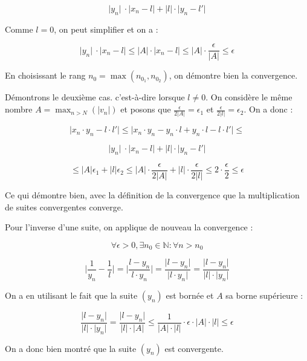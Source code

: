 $$\lvert  y_n  \rvert \ \cdot \lvert x_n - l\rvert + \lvert l \rvert \cdot \lvert y_n - l' \rvert$$

Comme $l = 0$, on peut simplifier et on a :

$$\lvert  y_n  \rvert \ \cdot \lvert x_n - l\rvert \leq \lvert A \rvert \cdot \lvert x_n - l\rvert \leq \lvert A \rvert \cdot \frac{\epsilon}{\lvert A \rvert} \leq \epsilon$$

En choisissant le rang $n_0 = \max({n_{0_1}, n_{0_2}})$, on démontre bien la convergence.

Démontrons le deuxième cas. c'est-à-dire lorsque $l \ne 0$. On considère le même nombre $A = \max_{n>N}({\lvert v_n \rvert})$ et posons que $\frac{\epsilon}{2 \lvert A \rvert} =  \epsilon_1$ et $\frac{\epsilon}{2 \lvert l \rvert} = \epsilon_2$. On a donc :

$$\lvert x_n \cdot y_n - l \cdot l' \rvert \leq \lvert x_n \cdot y_n  - y_n \cdot l + y_n\cdot l- l \cdot l' \rvert \leq $$

$$\lvert  y_n  \rvert \ \cdot \lvert x_n - l\rvert + \lvert l \rvert \cdot \lvert y_n - l' \rvert$$

$$ \leq \lvert A \rvert \epsilon_1 + \lvert l \rvert \epsilon_2 \leq \lvert A \rvert \cdot \frac{\epsilon}{2\lvert A \rvert} + \lvert l \rvert \cdot \frac{\epsilon}{2 \lvert l \rvert} \leq 2 \cdot \frac{\epsilon}{2} \leq \epsilon $$

Ce qui démontre bien, avec la définition de la convergence que la multiplication de suites convergentes converge.

Pour l'inverse d'une suite, on applique de nouveau la convergence :

$$\forall \epsilon > 0 , \exists n_0 \in \mathbb{N} : \forall n > n_0$$ 


$$\lvert \frac{1}{y_n} - \frac{1}{l} \rvert = \lvert \frac{l-y_n}{l \cdot y_n} \rvert = \frac{\lvert l-y_n \rvert}{ \lvert l \cdot y_n \rvert} =  \frac{\lvert l-y_n \rvert}{ \lvert l \rvert \cdot \lvert y_n \rvert}$$

On a en utilisant le fait que la suite $(y_n)$ est bornée et $A$ sa borne supérieure :


$$\frac{\lvert l-y_n \rvert}{ \lvert l \rvert \cdot \lvert y_n \rvert} = \frac{\lvert l-y_n \rvert}{ \lvert l \rvert \cdot \lvert A \rvert} \leq \frac{1}{\lvert A \rvert \cdot \lvert l \rvert} \cdot \epsilon \cdot \lvert A \rvert \cdot \lvert l \rvert \leq \epsilon $$

On a donc bien montré que la suite $(y_n)$ est convergente.


